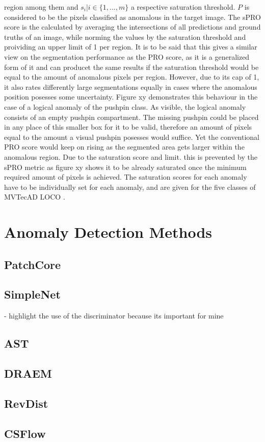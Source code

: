 region among them and $s_i | i \in \{1, ... , m\}$ a respective saturation threshold. $P$ is considered to be the pixels classified as anomalous 
in the target image. The sPRO score is the calculated by averaging the intersections of all predictions and ground truths of an image, 
while norming the values by the saturation threshold and proividing an upper limit of 1 per region. It is to be said that this gives a similar 
view on the segmentation performance as the PRO score, as it is a generalized form of it and can producet the same results if the saturation 
threshold would be equal to the amount of anomalous pixels per region. However, due to its cap of 1, it also rates differently large segmentations equally in cases 
where the anomalous position posesses some uncertainty. Figure xy demonstrates this behaviour in the case of a logical anomaly of the pushpin class. 
As visible, the logical anomaly consists of an empty pushpin compartment. The missing pushpin could be placed in any place of this smaller 
box for it to be valid, therefore an amount of pixels equal to the amount a visual pushpin posesses would suffice. Yet the conventional PRO score 
would keep on rising as the segmented area gets larger within the anomalous region. Due to the saturation score and limit. this is prevented 
by the sPRO metric as figure xy shows it to be already saturated once the minimum required amount of pixels is achieved. The saturation 
scores for each anomaly have to be individually set for each anomaly, and are given for the five classes of MVTecAD LOCO \cite{LOCODentsAndScratchesBergmann2022}.



\section{Anomaly Detection Methods}

\subsection{PatchCore}



\subsection{SimpleNet}
- highlight the use of the discriminator because its important for mine

\subsection{AST}

\subsection{DRAEM}

\subsection{RevDist}

\subsection{CSFlow}
















